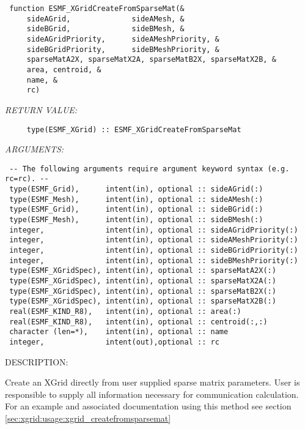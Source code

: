  
\begin{verbatim} 
 function ESMF_XGridCreateFromSparseMat(&
     sideAGrid,              sideAMesh, &
     sideBGrid,              sideBMesh, &
     sideAGridPriority,      sideAMeshPriority, &
     sideBGridPriority,      sideBMeshPriority, &
     sparseMatA2X, sparseMatX2A, sparseMatB2X, sparseMatX2B, &
     area, centroid, &
     name, &
     rc) 
 \end{verbatim}{\em RETURN VALUE:}
\begin{verbatim}     type(ESMF_XGrid) :: ESMF_XGridCreateFromSparseMat\end{verbatim}{\em ARGUMENTS:}
\begin{verbatim} -- The following arguments require argument keyword syntax (e.g. rc=rc). --
 type(ESMF_Grid),      intent(in), optional :: sideAGrid(:)
 type(ESMF_Mesh),      intent(in), optional :: sideAMesh(:)
 type(ESMF_Grid),      intent(in), optional :: sideBGrid(:)
 type(ESMF_Mesh),      intent(in), optional :: sideBMesh(:)
 integer,              intent(in), optional :: sideAGridPriority(:)
 integer,              intent(in), optional :: sideAMeshPriority(:)
 integer,              intent(in), optional :: sideBGridPriority(:)
 integer,              intent(in), optional :: sideBMeshPriority(:)
 type(ESMF_XGridSpec), intent(in), optional :: sparseMatA2X(:)
 type(ESMF_XGridSpec), intent(in), optional :: sparseMatX2A(:)
 type(ESMF_XGridSpec), intent(in), optional :: sparseMatB2X(:)
 type(ESMF_XGridSpec), intent(in), optional :: sparseMatX2B(:)
 real(ESMF_KIND_R8),   intent(in), optional :: area(:)
 real(ESMF_KIND_R8),   intent(in), optional :: centroid(:,:)
 character (len=*),    intent(in), optional :: name
 integer,              intent(out),optional :: rc 
 \end{verbatim}
{\sf DESCRIPTION:\\ }


        Create an XGrid directly from user supplied sparse matrix parameters. User
        is responsible to supply all information necessary for communication calculation. 
        For an example and associated documentation using this method see section 
        \ref{sec:xgrid:usage:xgrid_createfromsparsemat}
  

